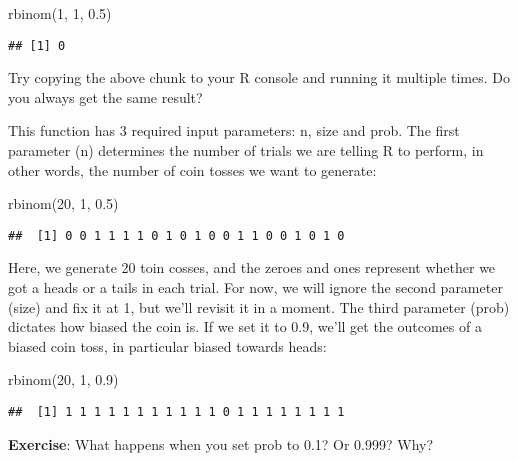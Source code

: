 \documentclass[
]{book}
\newenvironment{Shaded}{\begin{snugshade}}{\end{snugshade}}
\newcommand{\DecValTok}[1]{\textcolor[rgb]{0.00,0.00,0.81}{#1}}
\newcommand{\FloatTok}[1]{\textcolor[rgb]{0.00,0.00,0.81}{#1}}
\newcommand{\FunctionTok}[1]{\textcolor[rgb]{0.00,0.00,0.00}{#1}}
\newcommand{\NormalTok}[1]{#1}
\begin{document}
\begin{Shaded}
\begin{Highlighting}[]
\FunctionTok{rbinom}\NormalTok{(}\DecValTok{1}\NormalTok{, }\DecValTok{1}\NormalTok{, }\FloatTok{0.5}\NormalTok{)}
\end{Highlighting}
\end{Shaded}

\begin{verbatim}
## [1] 0
\end{verbatim}

Try copying the above chunk to your R console and running it multiple times. Do you always get the same result?

This function has 3 required input parameters: n, size and prob. The first parameter (n) determines the number of trials we are telling R to perform, in other words, the number of coin tosses we want to generate:

\begin{Shaded}
\begin{Highlighting}[]
\FunctionTok{rbinom}\NormalTok{(}\DecValTok{20}\NormalTok{, }\DecValTok{1}\NormalTok{, }\FloatTok{0.5}\NormalTok{)}
\end{Highlighting}
\end{Shaded}

\begin{verbatim}
##  [1] 0 0 1 1 1 1 0 1 0 1 0 0 1 1 0 0 1 0 1 0
\end{verbatim}

Here, we generate 20 toin cosses, and the zeroes and ones represent whether we got a heads or a tails in each trial. For now, we will ignore the second parameter (size) and fix it at 1, but we'll revisit it in a moment. The third parameter (prob) dictates how biased the coin is. If we set it to 0.9, we'll get the outcomes of a biased coin toss, in particular biased towards heads:

\begin{Shaded}
\begin{Highlighting}[]
\FunctionTok{rbinom}\NormalTok{(}\DecValTok{20}\NormalTok{, }\DecValTok{1}\NormalTok{, }\FloatTok{0.9}\NormalTok{)}
\end{Highlighting}
\end{Shaded}

\begin{verbatim}
##  [1] 1 1 1 1 1 1 1 1 1 1 1 0 1 1 1 1 1 1 1 1
\end{verbatim}

\textbf{Exercise}: What happens when you set prob to 0.1? Or 0.999? Why?
\end{document}
